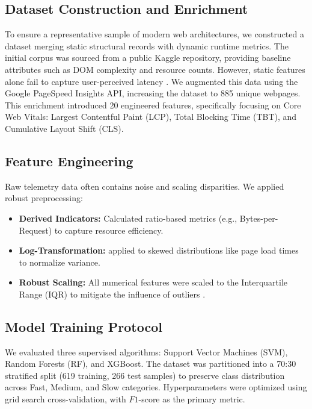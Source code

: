\documentclass[conference]{IEEEtran}
\begin{document}
\subsection{Dataset Construction and Enrichment}
To ensure a representative sample of modern web architectures, we constructed a dataset merging static structural records with dynamic runtime metrics. The initial corpus was sourced from a public Kaggle repository, providing baseline attributes such as DOM complexity and resource counts.
However, static features alone fail to capture user-perceived latency \cite{kaushik2024}. We augmented this data using the Google PageSpeed Insights API, increasing the dataset to 885 unique webpages. This enrichment introduced 20 engineered features, specifically focusing on Core Web Vitals: Largest Contentful Paint (LCP), Total Blocking Time (TBT), and Cumulative Layout Shift (CLS).

\subsection{Feature Engineering}
Raw telemetry data often contains noise and scaling disparities. We applied robust preprocessing:
\begin{itemize}
    \item \textbf{Derived Indicators:} Calculated ratio-based metrics (e.g., Bytes-per-Request) to capture resource efficiency.
    \item \textbf{Log-Transformation:} applied to skewed distributions like page load times to normalize variance.
    \item \textbf{Robust Scaling:} All numerical features were scaled to the Interquartile Range (IQR) to mitigate the influence of outliers \cite{xin2023}.
\end{itemize}

\subsection{Model Training Protocol}
We evaluated three supervised algorithms: Support Vector Machines (SVM), Random Forests (RF), and XGBoost. The dataset was partitioned into a 70:30 stratified split (619 training, 266 test samples) to preserve class distribution across Fast, Medium, and Slow categories. Hyperparameters were optimized using grid search cross-validation, with $F1$-score as the primary metric.
\end{document}
